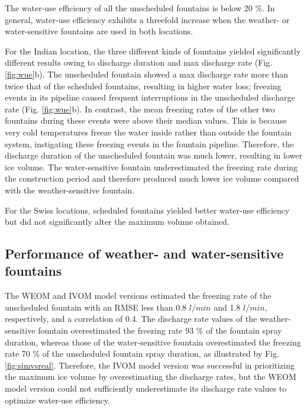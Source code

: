\documentclass[tc, manuscript]{copernicus}
\begin{document}
The water-use efficiency of all the unscheduled fountains is below 20 \%. In general, water-use efficiency
exhibits a threefold increase when the weather- or water-sensitive fountains are used in both
locations.  

For the Indian location, the three different kinds of fountains yielded significantly different results owing to discharge
duration and max discharge rate
(Fig. \ref{fig:wue}b). The unscheduled fountain showed a max discharge rate more than twice that of
the scheduled fountains, resulting in higher water loss; freezing events in its pipeline caused frequent
interruptions in the unscheduled discharge rate (Fig. \ref{fig:wue}b). In contrast, the mean freezing
rates of the other two fountains during these events were above their median values. This is because very cold
temperatures freeze the water inside rather than outside the fountain system, instigating these freezing events in
the fountain pipeline. Therefore, the discharge duration of the unscheduled fountain was much lower, resulting in
lower ice volume. The water-sensitive fountain underestimated the freezing rate during the construction period
and therefore produced much lower ice volume compared with the weather-sensitive fountain. 

For the Swiss locations, scheduled fountains yielded better water-use efficiency but did not significantly alter the maximum
volume obtained. 

\subsection{Performance of weather- and water-sensitive fountains}

The WEOM and IVOM model versions estimated the
freezing rate of the unscheduled fountain with an RMSE less than 0.8 $l/min$ and 1.8
$l/min$, respectively, and a correlation of 0.4. The discharge rate values of the weather-sensitive fountain overestimated the freezing
rate 93 \% of the fountain spray duration, whereas those of the water-sensitive fountain overestimated the
freezing rate 70 \% of the unscheduled fountain spray duration, as illustrated by Fig. \ref{fig:simvsreal}.
Therefore, the IVOM model version was successful in prioritizing the maximum ice volume by overestimating the
discharge rates, but the WEOM model version could not sufficiently underestimate its discharge rate values to
optimize water-use efficiency.
\end{document}
